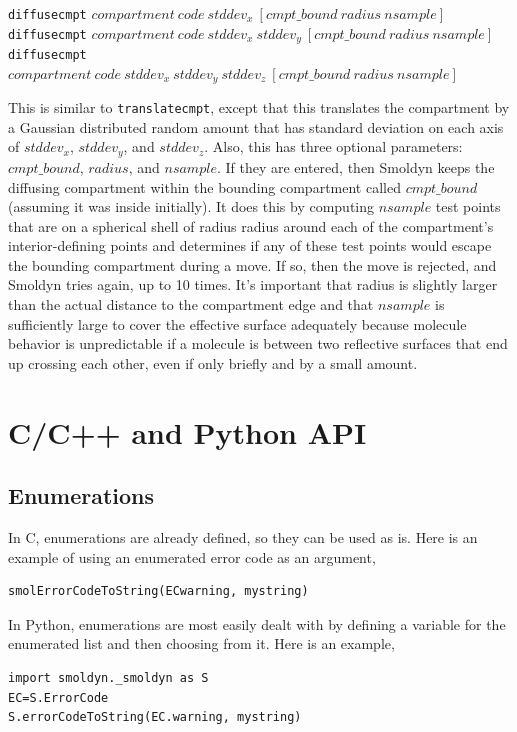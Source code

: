 \documentclass {scrbook}
\newcommand {\ttt} {\texttt}
\begin{document}
\begin{description}
\item{\ttt{diffusecmpt} $compartment\ code\ stddev_x\ [cmpt\_bound\ radius\ nsample]$\\
\ttt{diffusecmpt} $compartment\ code\ stddev_x\ stddev_y\ [cmpt\_bound\ radius\ nsample]$\\
\ttt{diffusecmpt} $compartment\ code\ stddev_x\ stddev_y\ stddev_z\ [cmpt\_bound\ radius\ nsample]$}

This is similar to \ttt{translatecmpt}, except that this translates the compartment by a Gaussian distributed random amount that has standard deviation on each axis of $stddev_x$, $stddev_y$, and $stddev_z$. Also, this has three optional parameters: $cmpt\_bound$, $radius$, and $nsample$. If they are entered, then Smoldyn keeps the diffusing compartment within the bounding compartment called $cmpt\_bound$ (assuming it was inside initially). It does this by computing $nsample$ test points that are on a spherical shell of radius radius around each of the compartment's interior-defining points and determines if any of these test points would escape the bounding compartment during a move. If so, then the move is rejected, and Smoldyn tries again, up to 10 times. It's important that radius is slightly larger than the actual distance to the compartment edge and that $nsample$ is sufficiently large to cover the effective surface adequately because molecule behavior is unpredictable if a molecule is between two reflective surfaces that end up crossing each other, even if only briefly and by a small amount. 

\end{description}


\chapter{C/C++ and Python API}



\section{Enumerations}

In C, enumerations are already defined, so they can be used as is. Here is an example of using an enumerated error code as an argument, 
\begin{lstlisting}[style=SSAC]
smolErrorCodeToString(ECwarning, mystring)
\end{lstlisting}

In Python, enumerations are most easily dealt with by defining a variable for the enumerated list and then choosing from it. Here is an example, 
\begin{lstlisting}[style=SSAC]
import smoldyn._smoldyn as S
EC=S.ErrorCode
S.errorCodeToString(EC.warning, mystring)
\end{lstlisting}
\end{document}
